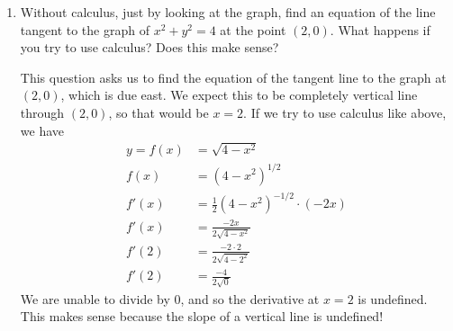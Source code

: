 \documentclass[main]{subfiles}
\begin{document}
\begin{enumerate}[resume]
\begin{enumerate}
    \begin{solution}
        $(0,2)$ is on the top half of the circle, which is described by the equation $y=\sqrt{4-x^2}$. To build a tangent line, we need a point on the line and the slope of the line. The point we require on the line is $(0,2)$. The slope can be found by taking the derivative and evaluating it at $x=0$. Let's do that below:
        \begin{align*}
            y=f(x)&=\sqrt{4-x^2}\\
            f(x)&=(4-x^2)^{1/2}\\
            f'(x)&=\frac{1}{2}(4-x^2)^{-1/2}\cdot (-2x)\\
            f'(x)&=\frac{-2x}{2\sqrt{4-x^2}}\\
            f'(0)&=\frac{-2\cdot 0}{2\sqrt{4-0^2}}\\
            f'(0)&=0
        \end{align*}
        Using point-slope form, the equation of the tangent line is $y-2=0(x-0)$ or $y-2=0$ or $y=2$. This is reasonable because the point where we are constructing the tangent line is at due north. We expect the tangent line to be a horizontal line at the $y$-value that corresponds to the radius, which is 2. That's exactly what $y=2$ is.
    \end{solution}

\item
\begin{problem}
Without calculus, just by looking at the graph, find an equation of the line tangent to the graph of $x^2+y^2=4$ at the point $(2,0)$. What happens if you try to use calculus? Does this make sense?
\end{problem}
\pspace{\vfill}

    \begin{solution}
        This question asks us to find the equation of the tangent line to the graph at $(2,0)$, which is due east. We expect this to be completely vertical line through $(2,0)$, so that would be $x=2$. If we try to use calculus like above, we have
        \begin{align*}
            y=f(x)&=\sqrt{4-x^2}\\
            f(x)&=(4-x^2)^{1/2}\\
            f'(x)&=\frac{1}{2}(4-x^2)^{-1/2}\cdot (-2x)\\
            f'(x)&=\frac{-2x}{2\sqrt{4-x^2}}\\
            f'(2)&=\frac{-2\cdot 2}{2\sqrt{4-2^2}}\\
            f'(2)&=\frac{-4}{2\sqrt{0}}
        \end{align*}
        We are unable to divide by 0, and so the derivative at $x=2$ is undefined. This makes sense because the slope of a vertical line is undefined!
    \end{solution}

\end{enumerate}
\end{enumerate}
\end{document}
